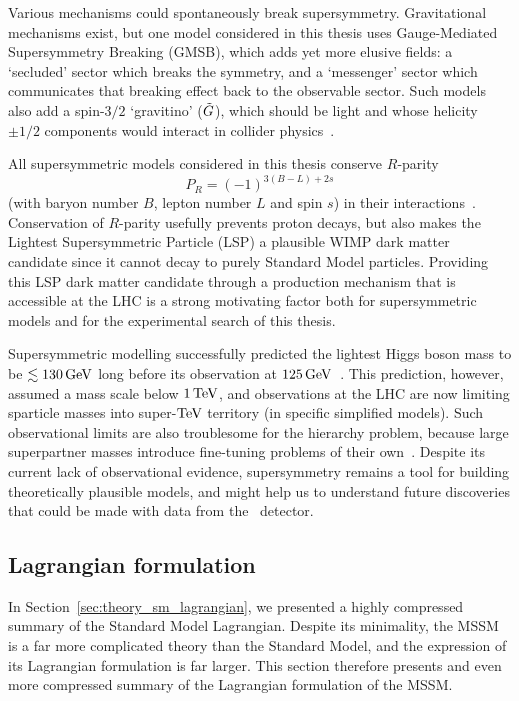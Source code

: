Various mechanisms could spontaneously break supersymmetry.
Gravitational mechanisms exist, but one model considered in this thesis uses
Gauge-Mediated Supersymmetry Breaking (GMSB),
which adds yet more elusive fields:
a `secluded' sector which breaks the symmetry, and
a `messenger' sector which
communicates that breaking effect back to the observable sector.
Such models also add a spin-$3/2$ `gravitino' ($\gravitino$),
which should be light and whose helicity $\pm1/2$ components would interact
in collider physics~\cite{
giudice1999gmsb,
dine1982pheno,
martin2016primer
}.

All supersymmetric models considered in this thesis conserve $R$-parity
\begin{equation}
P_R = (-1)^{3(B - L) + 2s}
\end{equation}
(with baryon number $B$, lepton number $L$ and spin $s$)
in their interactions~\cite{
farrar1978rparity,
martin2016primer
}.
Conservation of $R$-parity usefully prevents proton decays,
but also makes the Lightest Supersymmetric Particle (LSP) a plausible
WIMP dark matter candidate since it cannot decay to purely Standard Model
particles.
Providing this LSP dark matter candidate through a production mechanism
that is accessible at the LHC is a strong motivating factor both for
supersymmetric models and for the experimental search of this thesis.

Supersymmetric modelling successfully predicted the lightest Higgs boson
mass to be $\lesssim 130\,\eV[G]$ long before its observation at
$125\,\eV[G]$~\cite{
espinosa1992higgs,
espinosa1993upper,
quiros1997constraints,
wells2020discovery,
atlas2012higgs,
atlas2012combined,
cms2012higgs
}.
This prediction, however, assumed a mass scale below $1\,\eV[T]$,
and observations at the LHC are now limiting sparticle masses into
super-$\eV[T]$ territory (in specific simplified models).
Such observational limits are also troublesome for the hierarchy problem,
because large superpartner masses introduce fine-tuning problems of their
own~\cite{martin2016primer}.
Despite its current lack of observational evidence,
supersymmetry remains a tool for building theoretically plausible
models, and might help us to understand future discoveries
that could be made with data from the \atlas\ detector.

\subsection{Lagrangian formulation}
\label{sec:theory_susy_lagrangian}
In Section~\ref{sec:theory_sm_lagrangian}, we presented a highly compressed
summary of the Standard Model Lagrangian.
Despite its minimality, the MSSM is a far more complicated theory than the
Standard Model, and the expression of its Lagrangian formulation is
far larger.
This section therefore presents and even more compressed summary of the
Lagrangian formulation of the MSSM.

